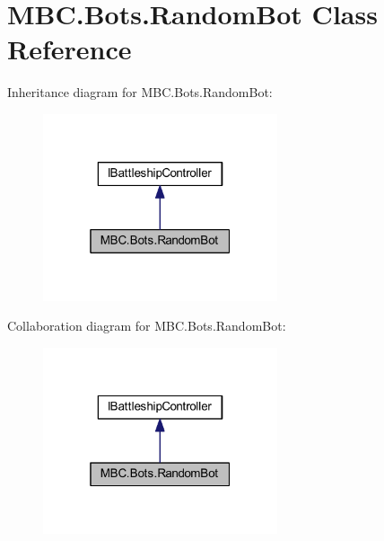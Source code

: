 \hypertarget{class_m_b_c_1_1_bots_1_1_random_bot}{\section{M\-B\-C.\-Bots.\-Random\-Bot Class Reference}
\label{class_m_b_c_1_1_bots_1_1_random_bot}
}


Inheritance diagram for M\-B\-C.\-Bots.\-Random\-Bot\-:\nopagebreak
\begin{figure}[H]
\begin{center}
\leavevmode
\includegraphics[width=196pt]{class_m_b_c_1_1_bots_1_1_random_bot__inherit__graph}
\end{center}
\end{figure}


Collaboration diagram for M\-B\-C.\-Bots.\-Random\-Bot\-:\nopagebreak
\begin{figure}[H]
\begin{center}
\leavevmode
\includegraphics[width=196pt]{class_m_b_c_1_1_bots_1_1_random_bot__coll__graph}
\end{center}
\end{figure}
